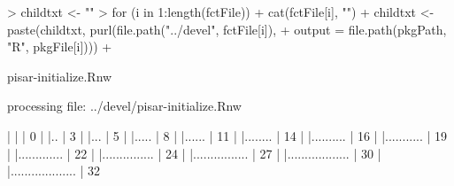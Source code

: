 \documentclass[a4paper,12pt]{article}\usepackage[]{graphicx}\usepackage[]{color}
\begin{document}
\begin{Schunk}
\begin{Sinput}
> childtxt <- ""
> for (i in 1:length(fctFile)) {
+     cat(fctFile[i], "\n")
+     childtxt <- paste(childtxt, purl(file.path("../devel", fctFile[i]), 
+         output = file.path(pkgPath, "R", pkgFile[i])))
+ }
\end{Sinput}
\begin{Soutput}
pisar-initialize.Rnw 
\end{Soutput}
\begin{Soutput}


processing file: ../devel/pisar-initialize.Rnw
\end{Soutput}
\begin{Soutput}

  |                                                                  
  |                                                            |   0%
  |                                                                  
  |..                                                          |   3%
  |                                                                  
  |...                                                         |   5%
  |                                                                  
  |.....                                                       |   8%
  |                                                                  
  |......                                                      |  11%
  |                                                                  
  |........                                                    |  14%
  |                                                                  
  |..........                                                  |  16%
  |                                                                  
  |...........                                                 |  19%
  |                                                                  
  |.............                                               |  22%
  |                                                                  
  |...............                                             |  24%
  |                                                                  
  |................                                            |  27%
  |                                                                  
  |..................                                          |  30%
  |                                                                  
  |...................                                         |  32%

\end{Soutput}
\end{Schunk}
\end{document}
